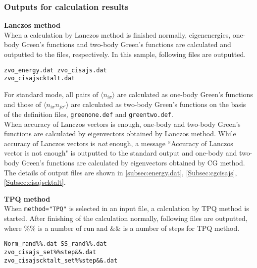 \subsubsection{Outputs for calculation results}
\begin{description}
\item {\bf Lanczos method}\\
When a calculation by Lanczos method is finished normally, eigenenergies, one-body Green's functions and two-body Green's functions are calculated and outputted to the files, respectively. In this sample, following files are outputted.\\

\begin{minipage}{12cm}
\begin{screen}
\begin{verbatim}
zvo_energy.dat zvo_cisajs.dat 
zvo_cisajscktalt.dat  
\end{verbatim}
\end{screen}
\end{minipage}

For standard mode, all pairs of $\langle n_{i\sigma} \rangle$ are calculated as one-body Green's functions and those of $\langle n_{i\sigma} n_{j\sigma'} \rangle$ are calculated as two-body Green's functions on the basis of the definition files, \verb|greenone.def| and \verb|greentwo.def|. \\
When accuracy of Lanczos vectors is enough, one-body and two-body Green's functions are calculated by eigenvectors obtained by Lanczos method. While accuracy of Lanczos vectors is {\it not} enough, a message ``Accuracy of Lanczos vector is not enough" is outputted to the standard output and one-body and two-body Green's functions are calculated by eigenvectors obtained by CG method.
The details of output files are shown in \ref{subsec:energy.dat}, \ref{Subsec:cgcisajs}, \ref{Subsec:cisajscktalt}.

\item {\bf TPQ method}\\
When \verb|method="TPQ"| is selected in an input file, a calculation by TPQ method is started. After finishing of the calculation normally, following files are outputted, where \%\% is a number of run and \&\& is a number of steps for TPQ method.\\
\begin{minipage}{14cm}
\begin{screen}
\begin{verbatim}
Norm_rand%%.dat SS_rand%%.dat
zvo_cisajs_set%%step&&.dat  
zvo_cisajscktalt_set%%step&&.dat  
\end{verbatim}
\end{screen}
\end{minipage}


\end{description}
